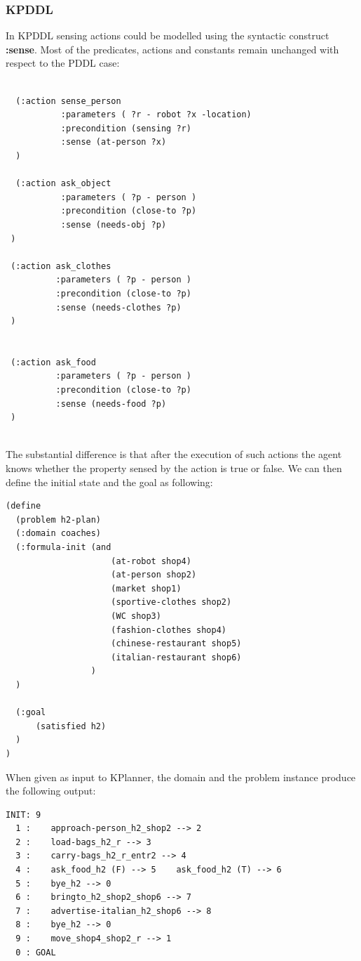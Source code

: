 \documentclass[pdftex,12pt,a4paper]{report}
\begin{document}
\subsubsection{KPDDL}
In KPDDL sensing actions could be modelled using the syntactic construct \textbf{:sense}. Most of the predicates, actions and constants remain unchanged with respect to the PDDL case:
\begin{verbatim}

  (:action sense_person
           :parameters ( ?r - robot ?x -location)
           :precondition (sensing ?r)
           :sense (at-person ?x)
  )

  (:action ask_object
           :parameters ( ?p - person )
           :precondition (close-to ?p)
           :sense (needs-obj ?p)
 )

 (:action ask_clothes
          :parameters ( ?p - person )
          :precondition (close-to ?p)
          :sense (needs-clothes ?p)
 )


 (:action ask_food
          :parameters ( ?p - person )
          :precondition (close-to ?p)
          :sense (needs-food ?p)
 )
\end{verbatim}\\
\noindent The substantial difference is that after the execution of such actions the agent knows whether the property sensed by the action is true or false. 
\noindent We can then define the initial state and the goal as following:
\begin{verbatim}
(define
  (problem h2-plan)
  (:domain coaches)
  (:formula-init (and
                     (at-robot shop4)
                     (at-person shop2)
                     (market shop1)
                     (sportive-clothes shop2)
                     (WC shop3)
                     (fashion-clothes shop4)
                     (chinese-restaurant shop5)
                     (italian-restaurant shop6)
                 )
  )

  (:goal
      (satisfied h2)
  )
)
\end{verbatim}
\newpage
\noindent When given as input to KPlanner, the domain and the problem instance produce the following output:
\begin{verbatim}
INIT: 9
  1 :    approach-person_h2_shop2 --> 2 
  2 :    load-bags_h2_r --> 3 
  3 :    carry-bags_h2_r_entr2 --> 4 
  4 :    ask_food_h2 (F) --> 5    ask_food_h2 (T) --> 6 
  5 :    bye_h2 --> 0 
  6 :    bringto_h2_shop2_shop6 --> 7 
  7 :    advertise-italian_h2_shop6 --> 8 
  8 :    bye_h2 --> 0 
  9 :    move_shop4_shop2_r --> 1 
  0 : GOAL
\end{verbatim}\\
\end{document}
